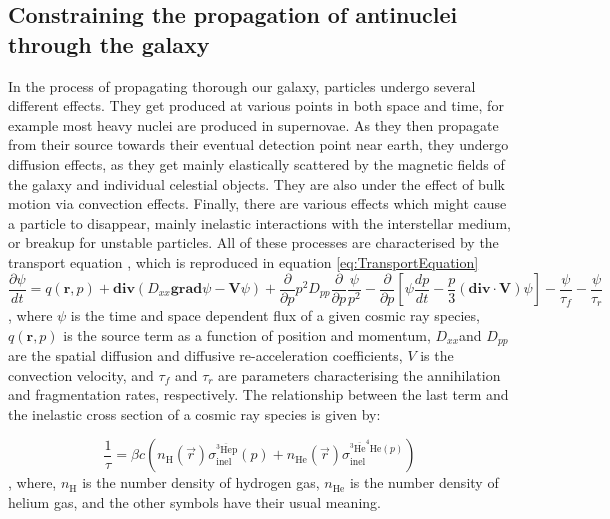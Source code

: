 \subsection{Constraining the propagation of antinuclei through the galaxy}\label{sec:Propagation}
In the process of propagating thorough our galaxy, particles undergo several different effects. They get produced at various points in both space and time, for example most heavy nuclei are produced in supernovae. As they then propagate from their source towards their eventual detection point near earth, they undergo diffusion effects, as they get mainly elastically scattered by the magnetic fields of the galaxy and individual celestial objects. They are also under the effect of bulk motion via convection effects. Finally, there are various effects which might cause a particle to disappear, mainly inelastic interactions with the interstellar medium, or breakup for unstable particles. All of these processes are characterised by the transport equation \cite{}, which is reproduced in equation \ref{eq:TransportEquation}
\begin{equation}
    \label{eq:TransportEquation}
    \frac{\partial\psi}{dt} = q(\textbf{r},p) + \mathrm{\textbf{div}}(D_{xx}\mathrm{\textbf{grad}}\psi - \textbf{V}\psi) + \frac{\partial}{\partial p}p^2D_{pp} \frac{\partial}{\partial p}\frac{\psi}{p^2} - \frac{\partial}{\partial p} \left[ \psi \frac{dp}{d t}   -\frac{p}{3} (\mathrm{\textbf{div}}\cdot  \mathrm{\textbf{V}} )\psi              \right] - \frac{\psi}{\tau_f}-\frac{\psi}{\tau_r}
\end{equation}
, where $\psi$ is the time and space dependent flux of a given cosmic ray species, $q(\textbf{r},p)$ is the source term as a function of position and momentum, $D_{xx}$and $D_{pp}$ are the spatial diffusion and diffusive re-acceleration coefficients, $V$ is the convection velocity, and $\tau_f$ and $\tau_r$ are parameters characterising the annihilation and fragmentation rates, respectively. The relationship between the last term and the inelastic cross section of a cosmic ray species is given by: 

\begin{equation}\label{eq:annihilation_lossTerm_relation}
    \frac{1}{\tau} = \beta c \left( n_\mathrm{H}(\vec{r})\sigma_{\mathrm{inel}}^{^3\mathrm{\overline{He}p}} (p) + n_{\mathrm{He}}(\vec{r})\sigma_{\mathrm{inel}}^{^3\mathrm{\overline{He}^4He} (p)} 
    \right)
\end{equation},
where, $n_\mathrm{H}$ is the number density of hydrogen gas, $n_\mathrm{He}$ is the number density of helium gas, and the other symbols have their usual meaning.\\

